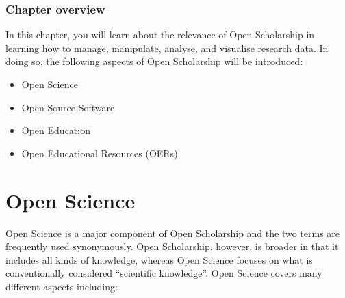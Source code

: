 \documentclass[
  letterpaper,
  DIV=11,
  numbers=noendperiod]{scrreprt}
\providecommand{\tightlist}{%
  \setlength{\itemsep}{0pt}\setlength{\parskip}{0pt}}
\begin{document}
\subsubsection*{\texorpdfstring{\textbf{Chapter
overview}}{Chapter overview}}\label{chapter-overview}

In this chapter, you will learn about the relevance of Open Scholarship
in learning how to manage, manipulate, analyse, and visualise research
data. In doing so, the following aspects of Open Scholarship will be
introduced:

\begin{itemize}
\tightlist
\item
  Open Science
\item
  Open Source Software
\item
  Open Education
\item
  Open Educational Resources (OERs)
\end{itemize}

\section{Open Science}\label{sec-OpenScience}

Open Science is a major component of Open Scholarship and the two terms
are frequently used synonymously. Open Scholarship, however, is broader
in that it includes all kinds of knowledge, whereas Open Science focuses
on what is conventionally considered ``scientific knowledge''. Open
Science covers many different aspects including:
\end{document}

